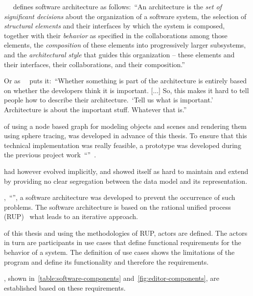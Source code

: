 \documentclass[%
    a4paper,    %
    justified,  %
    nobib,      %
    openany     %
]{tufte-book}
\begin{document}
~\citeauthor{kruchten_rup_2003}~\cite{kruchten_rup_2003} defines
software architecture as follows:~\enquote{An architecture is the \textit{set of
significant decisions} about the organization of a software system, the
selection of \textit{structural elements} and their interfaces by which the
system is composed, together with their \textit{behavior} as specified in the
collaborations among those elements, the \textit{composition} of these elements
into progressively larger subsystems, and the \textit{architectural style} that
guides this organization -- these elements and their interfaces, their
collaborations, and their composition.}

Or as~\citeauthor{fowler_architect_2003}~\cite{folwer_architect_2003} puts
it:~\enquote{Whether something is part of the architecture is entirely based on
whether the developers think it is important. [...] So, this makes it hard to
tell people how to describe their architecture.~\enquote{Tell us what is
important.} Architecture is about the important stuff. Whatever that
is.}

 of using a node based graph for
modeling objects and scenes and rendering them using sphere tracing, was
developed in advance of this thesis. To ensure that this technical
implementation was really feasible, a prototype was developed during the
previous project
work~\enquote{}~\cite{osterwalder-volume-2016}.

 had however evolved implicitly,
and showed itself as hard to maintain and extend by providing no clear
segregation between the data model and its representation.

,~\enquote{}, a software architecture was
developed to prevent the occurrence of such problems. The software architecture
is based on the rational unified process (RUP)~\cite{kruchten_rup_2003} what
leads to an iterative approach.

 of this thesis and using the methodologies of
RUP, actors are defined. The actors in turn are participants in use cases that
define functional requirements for the behavior of a system. The definition of
use cases shows the limitations of the program and define its functionality and
therefore the requirements.

, shown in~\autoref{table:software-components}
and~\autoref{fig:editor-components}, are established based on these
requirements.
\end{document}
